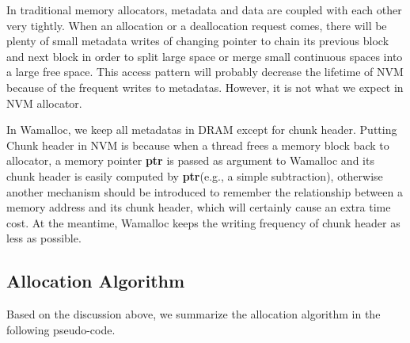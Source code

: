 \documentclass[10pt, conference, compsocconf]{IEEEtran}
\begin{document}
In traditional memory allocators, metadata and data are coupled with each other very tightly.
When an allocation or a deallocation request comes, 
there will be plenty of small metadata writes of changing pointer to chain its previous block and next block 
in order to split large space or merge small continuous spaces into a large free space.
This access pattern will probably decrease the lifetime of NVM because of the frequent writes to metadatas.
However, it is not what we expect in NVM allocator.

In Wamalloc, we keep all metadatas in DRAM except for chunk header. 
Putting Chunk header in NVM is because when a thread frees a memory block back to allocator, 
a memory pointer \textbf{ptr} is passed as argument to Wamalloc and 
its chunk header is easily computed by \textbf{ptr}(e.g., a simple subtraction),
otherwise another mechanism should be introduced to remember the relationship between a memory address and its chunk header,
which will certainly cause an extra time cost.
At the meantime, Wamalloc keeps the writing frequency of chunk header as less as possible. 

\subsection{Allocation Algorithm}

Based on the discussion above, we summarize the allocation algorithm in the following pseudo-code.
\end{document}
